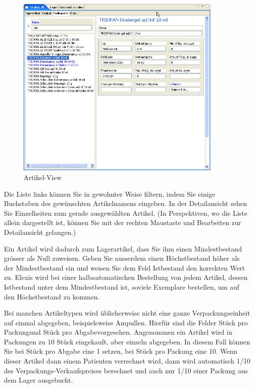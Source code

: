 \begin{figure}[htp]
\begin{center}
  \includegraphics[width=0.9\textwidth]{images/artikelview}
  \caption{Artikel-View}
  \label{fig:artikel}
\end{center}
\end{figure}
Die Liste links können Sie in gewohnter Weise filtern, indem Sie einige
Buchstaben des gewünschten Artikelnamens eingeben.
In der Detailansicht sehen Sie Einzelheiten zum gerade ausgewählten Artikel. (In
Perspektiven, wo die Liste allein dargestellt ist, können Sie mit der rechten
Maustaste und \glqq Bearbeiten\grqq{} zur Detailansicht gelangen.)

Ein Artikel wird dadurch zum Lagerartikel, dass Sie ihm einen Mindestbestand
grösser als Null zuweisen. Geben Sie ausserdem einen Höchstbestand höher als der
Mindestbestand ein und weisen Sie dem Feld \glqq Istbestand\grqq{} den korrekten
Wert zu. Elexis wird bei einer halbautomatischen Bestellung von jedem Artikel,
dessen Istbestand unter dem Mindestbestand ist, soviele Exemplare bestellen, um
auf den Höchstbestand zu kommen.

Bei manchen Artikeltypen wird üblicherweise nicht eine ganze Verpackungseinheit
auf einmal abgegeben, beispielsweise Ampullen. Hierfür sind die Felder \glqq
Stück pro Packung\grqq{}und \glqq Stück pro Abgabe\grqq{}vorgesehen. Angenommen
ein Artikel wird in Packungen zu 10 Stück eingekauft, aber einzeln abgegeben.
In diesem Fall können Sie bei Stück pro Abgabe eine 1 setzen, bei Stück pro
Packung eine 10. Wenn dieser Artikel dann einem Patienten verrechnet wird, dann
wird automatisch 1/10 des Verpackungs-Verkaufspreises berechnet und auch nur
1/10 einer Packung aus dem Lager ausgebucht.

